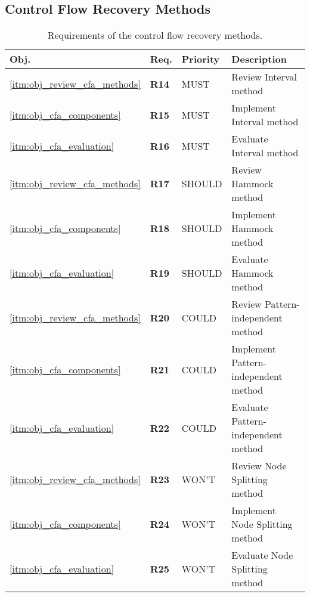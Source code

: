 
\subsection{Control Flow Recovery Methods}
\label{sec:req_control_flow_recovery_methods}


\begin{table}[htbp]
	\begin{center}
		\begin{tabular}{|l|l|l|l|}
			\hline
			Obj. & Req. & Priority & Description \\
			\hline
			\ref{itm:obj_review_cfa_methods} & \textbf{R14} & MUST & Review Interval method \\
			\ref{itm:obj_cfa_components} & \textbf{R15} & MUST & Implement Interval method \\
			\ref{itm:obj_cfa_evaluation} & \textbf{R16} & MUST & Evaluate Interval method \\
			\hline
			\ref{itm:obj_review_cfa_methods} & \textbf{R17} & SHOULD & Review Hammock method \\
			\ref{itm:obj_cfa_components} & \textbf{R18} & SHOULD & Implement Hammock method \\
			\ref{itm:obj_cfa_evaluation} & \textbf{R19} & SHOULD & Evaluate Hammock method \\
			\hline
			\ref{itm:obj_review_cfa_methods} & \textbf{R20} & COULD & Review Pattern-independent method \\
			\ref{itm:obj_cfa_components} & \textbf{R21} & COULD & Implement Pattern-independent method \\
			\ref{itm:obj_cfa_evaluation} & \textbf{R22} & COULD & Evaluate Pattern-independent method \\
			\hline
			\ref{itm:obj_review_cfa_methods} & \textbf{R23} & WON'T & Review Node Splitting method \\
			\ref{itm:obj_cfa_components} & \textbf{R24} & WON'T & Implement Node Splitting method \\
			\ref{itm:obj_cfa_evaluation} & \textbf{R25} & WON'T & Evaluate Node Splitting method \\
			\hline
		\end{tabular}
	\end{center}
	\caption{Requirements of the control flow recovery methods.}
\end{table}
